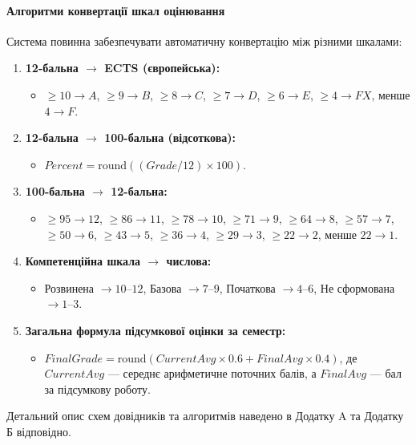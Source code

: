 \documentclass{article}
\begin{document}
\paragraph{Алгоритми конвертації шкал оцінювання}
Система повинна забезпечувати автоматичну конвертацію між різними шкалами:
\begin{enumerate}
    \item \textbf{12-бальна $\rightarrow$ ECTS (європейська):}
    \begin{itemize}
        \item $\ge 10 \rightarrow A$, $\ge 9 \rightarrow B$, $\ge 8 \rightarrow C$, $\ge 7 \rightarrow D$, $\ge 6 \rightarrow E$, $\ge 4 \rightarrow FX$, менше $4 \rightarrow F$.
    \end{itemize}
    \item \textbf{12-бальна $\rightarrow$ 100-бальна (відсоткова):}
    \begin{itemize}
        \item $Percent = \text{round}((Grade / 12) \times 100)$.
    \end{itemize}
    \item \textbf{100-бальна $\rightarrow$ 12-бальна:}
    \begin{itemize}
        \item $\ge 95 \rightarrow 12$, $\ge 86 \rightarrow 11$, $\ge 78 \rightarrow 10$, $\ge 71 \rightarrow 9$, $\ge 64 \rightarrow 8$, $\ge 57 \rightarrow 7$, $\ge 50 \rightarrow 6$, $\ge 43 \rightarrow 5$, $\ge 36 \rightarrow 4$, $\ge 29 \rightarrow 3$, $\ge 22 \rightarrow 2$, менше $22 \rightarrow 1$.
    \end{itemize}
    \item \textbf{Компетенційна шкала $\rightarrow$ числова:}
    \begin{itemize}
        \item Розвинена $\rightarrow 10\text{--}12$, Базова $\rightarrow 7\text{--}9$, Початкова $\rightarrow 4\text{--}6$, Не сформована $\rightarrow 1\text{--}3$.
    \end{itemize}
    \item \textbf{Загальна формула підсумкової оцінки за семестр:}
    \begin{itemize}
        \item $FinalGrade = \text{round}(CurrentAvg \times 0.6 + FinalAvg \times 0.4)$, де $CurrentAvg$ --- середнє арифметичне поточних балів, а $FinalAvg$ --- бал за підсумкову роботу.
    \end{itemize}
\end{enumerate}
Детальний опис схем довідників та алгоритмів наведено в Додатку A та Додатку Б відповідно.
\end{document}

